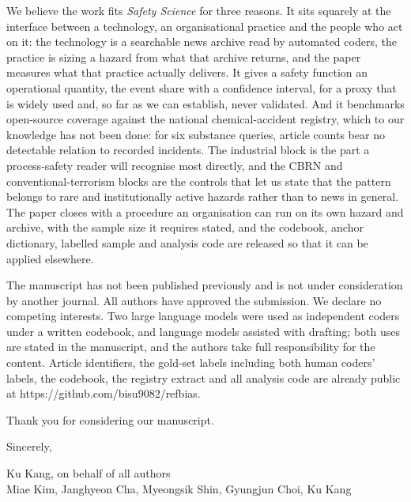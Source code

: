 \documentclass[11pt]{article}
\begin{document}
We believe the work fits \emph{Safety Science} for three reasons. It sits squarely at the interface between a technology, an organisational practice and the people who act on it: the technology is a searchable news archive read by automated coders, the practice is sizing a hazard from what that archive returns, and the paper measures what that practice actually delivers. It gives a safety function an operational quantity, the event share with a confidence interval, for a proxy that is widely used and, so far as we can establish, never validated. And it benchmarks open-source coverage against the national chemical-accident registry, which to our knowledge has not been done: for six substance queries, article counts bear no detectable relation to recorded incidents. The industrial block is the part a process-safety reader will recognise most directly, and the CBRN and conventional-terrorism blocks are the controls that let us state that the pattern belongs to rare and institutionally active hazards rather than to news in general. The paper closes with a procedure an organisation can run on its own hazard and archive, with the sample size it requires stated, and the codebook, anchor dictionary, labelled sample and analysis code are released so that it can be applied elsewhere.

The manuscript has not been published previously and is not under consideration by another journal. All authors have approved the submission. We declare no competing interests. Two large language models were used as independent coders under a written codebook, and language models assisted with drafting; both uses are stated in the manuscript, and the authors take full responsibility for the content. Article identifiers, the gold-set labels including both human coders' labels, the codebook, the registry extract and all analysis code are already public at https://github.com/bisu9082/refbias.

Thank you for considering our manuscript.

\vspace{1em}
\noindent Sincerely,

\vspace{1.5em}
\noindent Ku Kang, on behalf of all authors\\
Miae Kim, Janghyeon Cha, Myeongsik Shin, Gyungjun Choi, Ku Kang
\end{document}
